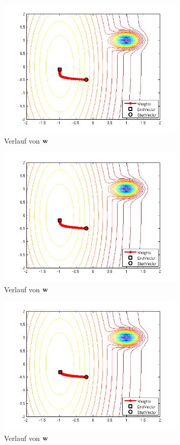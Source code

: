\begin{figure}[h!]
  \centering
  \includegraphics[width=0.8\textwidth]{./figures/212/path_w02_eta015.png}
  \caption{Verlauf von $\mathbf{w}$}
  \label{fig:impulse_path_w02_eta015}
\end{figure}

\begin{figure}[h!]
  \centering
  \includegraphics[width=0.8\textwidth]{./figures/212/path_w02_eta01.png}
  \caption{Verlauf von $\mathbf{w}$}
  \label{fig:impulse_path_w02_eta01}
\end{figure}

\begin{figure}[h!]
  \centering
  \includegraphics[width=0.8\textwidth]{./figures/212/path_w02_eta005.png}
  \caption{Verlauf von $\mathbf{w}$}
  \label{fig:impulse_path_w02_eta005}
\end{figure}

